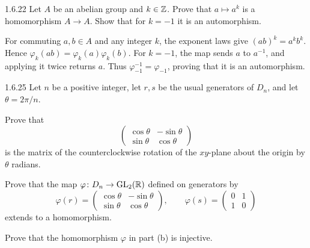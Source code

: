 \documentclass[11pt,oneside]{article}
\begin{document}
\begin{exercise}{1.6.22}
Let $A$ be an abelian group and $k\in\mathbb{Z}$. Prove that $a\mapsto a^k$ is a homomorphism $A\to A$. Show that for $k=-1$ it is an automorphism.
\end{exercise}

\begin{solution}
For commuting $a,b\in A$ and any integer $k$, the exponent laws give $(ab)^k=a^kb^k$. Hence $\varphi_k(ab)=\varphi_k(a)\varphi_k(b)$. For $k=-1$, the map sends $a$ to $a^{-1}$, and applying it twice returns $a$. Thus $\varphi_{-1}^{-1}=\varphi_{-1}$, proving that it is an automorphism.
\end{solution}

\begin{exercise}{1.6.25}
Let $n$ be a positive integer, let $r,s$ be the usual generators of $D_n$, and let $\theta=2\pi/n$.
\begin{exercisesubparts}
\item Prove that
\[
\begin{pmatrix}
\cos\theta&-\sin\theta\\
\sin\theta&\cos\theta
\end{pmatrix}
\]
is the matrix of the counterclockwise rotation of the $xy$-plane about the origin by $\theta$ radians.
\item Prove that the map $\varphi\colon D_n\to\operatorname{GL}_2(\mathbb{R})$ defined on generators by
\[
\varphi(r)=\begin{pmatrix}\cos\theta&-\sin\theta\\\sin\theta&\cos\theta\end{pmatrix},
\qquad
\varphi(s)=\begin{pmatrix}0&1\\1&0\end{pmatrix}
\]
extends to a homomorphism.
\item Prove that the homomorphism $\varphi$ in part (b) is injective.
\end{exercisesubparts}
\end{exercise}
\end{document}
